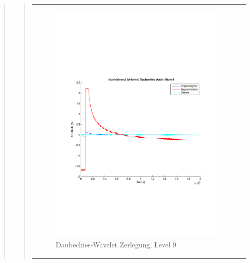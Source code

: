 \begin{quote}
\begin{quote}
\begin{center}
\begin{tabular}{ll}
\begin{minipage}{0.6\textwidth}
                    \end{minipage}
                    \begin{minipage}{0.6\textwidth}
    
                        \begin{figure}[H]
                            \label{fig:}
                            \includegraphics[scale=0.4, trim = 2cm 6cm 1cm
                            7.5cm,
                            clip]{./Bilder/Termin8/fehlerfrei_hochlaufen_Daubechies_Wavlet_lvl_9}
                            \caption{Daubechies-Wavelet Zerlegung, Level 9}
                        \end{figure}
                    \vspace{-1.5em}
    
                    \end{minipage}
    

\end{tabular}
\end{center}
\end{quote}
\end{quote}
